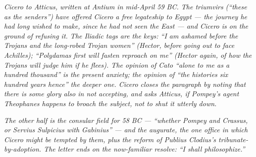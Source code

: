 
\textit{Cicero to Atticus, written at Antium in mid-April 59
BC. The triumvirs (``these as the senders'') have offered
Cicero a free legateship to Egypt --- the journey he had
long wished to make, since he had not seen the East ---
and Cicero is on the ground of refusing it. The Iliadic
tags are the keys: ``I am ashamed before the Trojans and
the long-robed Trojan women'' (Hector, before going out
to face Achilles); ``Polydamas first will fasten reproach
on me'' (Hector again, of how the Trojans will judge him
if he flees). The opinion of Cato ``alone to me as a
hundred thousand'' is the present anxiety; the opinion of
``the histories six hundred years hence'' the deeper one.
Cicero closes the paragraph by noting that there is some
glory also in not accepting, and asks Atticus, if Pompey's
agent Theophanes happens to broach the subject, not to
shut it utterly down.}

\textit{The other half is the consular field for 58 BC ---
``whether Pompey and Crassus, or Servius Sulpicius with
Gabinius'' --- and the augurate, the one office in which
Cicero might be tempted by them, plus the reform of
Publius Clodius's tribunate-by-adoption. The letter ends
on the now-familiar resolve: ``I shall philosophize.''}
